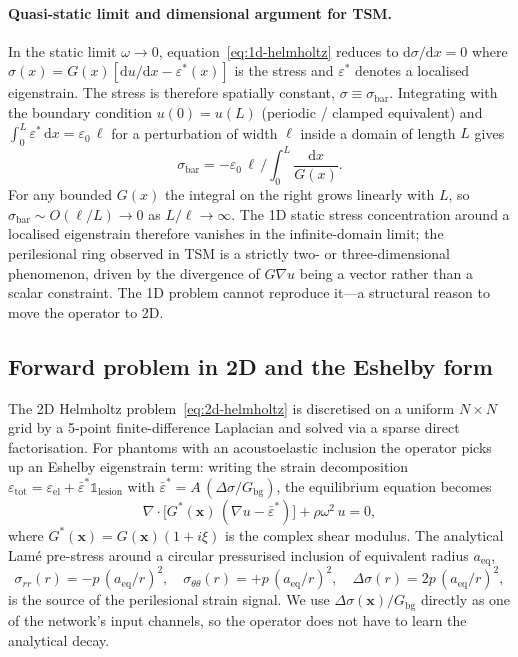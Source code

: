 \documentclass[11pt,letterpaper]{article}
\newcommand{\xvec}{\bm{x}}
\newcommand{\Gbg}{G_{\mathrm{bg}}}
\newcommand{\eps}{\varepsilon}
\newcommand{\Dsig}{\Delta\sigma}
\newcommand{\aeq}{a_{\mathrm{eq}}}
\begin{document}
\paragraph{Quasi-static limit and dimensional argument for TSM.}
In the static limit $\omega\to 0$, equation~\eqref{eq:1d-helmholtz} reduces
to $\mathrm{d}\sigma/\mathrm{d}x=0$ where
$\sigma(x)=G(x)[\mathrm{d}u/\mathrm{d}x - \eps^{*}(x)]$ is the stress and
$\eps^{*}$ denotes a localised eigenstrain. The stress is therefore
spatially constant, $\sigma\equiv\sigma_{\mathrm{bar}}$. Integrating with
the boundary condition $u(0)=u(L)$ (periodic / clamped equivalent) and
$\int_{0}^{L}\eps^{*}\,\mathrm{d}x=\eps_{0}\,\ell$ for a perturbation of
width $\ell$ inside a domain of length $L$ gives
\begin{equation}
\sigma_{\mathrm{bar}} = -\eps_{0}\,\ell\, \Bigg/
\int_{0}^{L}\!\frac{\mathrm{d}x}{G(x)}.
\label{eq:static}
\end{equation}
For any bounded $G(x)$ the integral on the right grows linearly with $L$,
so $\sigma_{\mathrm{bar}}\sim O(\ell/L)\to 0$ as $L/\ell\to\infty$. The
1D static stress concentration around a localised eigenstrain therefore
vanishes in the infinite-domain limit; the perilesional ring observed in
TSM is a strictly two- or three-dimensional phenomenon, driven by the
divergence of $G\nabla u$ being a vector rather than a scalar
constraint. The 1D problem cannot reproduce it---a structural reason to
move the operator to 2D.

\subsection*{Forward problem in 2D and the Eshelby form}
\label{sec:methods-2d}

The 2D Helmholtz problem~\eqref{eq:2d-helmholtz} is discretised on a
uniform $N\!\times\!N$ grid by a 5-point finite-difference Laplacian and
solved via a sparse direct factorisation. For phantoms with an
acoustoelastic inclusion the operator picks up an Eshelby eigenstrain
term: writing the strain decomposition
$\eps_{\mathrm{tot}}=\eps_{\mathrm{el}}+\bar\eps^{*}\mathbb{1}_{\mathrm{lesion}}$
with $\bar\eps^{*}=A\,(\Dsig/\Gbg)$, the equilibrium equation becomes
\begin{equation}
\nabla\!\cdot\!\bigl[G^{*}(\xvec)\,(\nabla u - \bar\eps^{*})\bigr]
+ \rho\omega^{2}\,u = 0,
\label{eq:eshelby}
\end{equation}
where $G^{*}(\xvec)=G(\xvec)(1+i\xi)$ is the complex shear modulus. The
analytical Lam\'e pre-stress around a circular pressurised inclusion of
equivalent radius $\aeq$,
\begin{equation}
\sigma_{rr}(r) = -p\,(\aeq/r)^{2},\quad
\sigma_{\theta\theta}(r) = +p\,(\aeq/r)^{2},\quad
\Dsig(r) = 2p\,(\aeq/r)^{2},
\label{eq:lame}
\end{equation}
is the source of the perilesional strain signal. We use
$\Dsig(\xvec)/\Gbg$ directly as one of the network's input channels, so
the operator does not have to learn the analytical decay.
\end{document}
